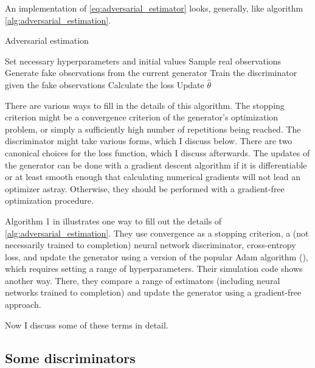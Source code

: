 An implementation of \ref{eq:adversarial_estimator} looks, generally, like algorithm \ref{alg:adversarial_estimation}.

\begin{algorithm}
    \caption{Adversarial estimation}
    \label{alg:adversarial_estimation}
    \begin{algorithmic}
        \STATE Set necessary hyperparameters and initial values
        \STATE Sample real observations
            \STATE Generate fake observations from the current generator
            \STATE Train the discriminator given the fake observations
            \STATE Calculate the loss
            \STATE Update $\hat{\theta}$ %
        \ENDWHILE
    \end{algorithmic}
\end{algorithm}

There are various ways to fill in the details of this algorithm.
The stopping criterion might be a convergence criterion of the generator's optimization problem, or simply a sufficiently high number of repetitions being reached.
The discriminator might take various forms, which I discuss below.
There are two canonical choices for the loss function, which I discuss afterwards.
The updates of the generator can be done with a gradient descent algorithm if it is differentiable or at least smooth enough that calculating numerical gradients will not lead an optimizer astray.
Otherwise, they should be performed with a gradient-free optimization procedure.

Algorithm 1 in \textcite{kaji2023adversarial} illustrates one way to fill out the details of \ref{alg:adversarial_estimation}.
They use convergence as a stopping criterion, a (not necessarily trained to completion) neural network discriminator, cross-entropy loss, and update the generator using a version of the popular Adam algorithm (\cite{diederik2014adam}), which requires setting a range of hyperparameters.
Their simulation code shows another way. %
There, they compare a range of estimators (including neural networks trained to completion) and update the generator using a gradient-free approach.

Now I discuss some of these terms in detail.

\subsection{Some discriminators}
\label{sec:discriminators}

